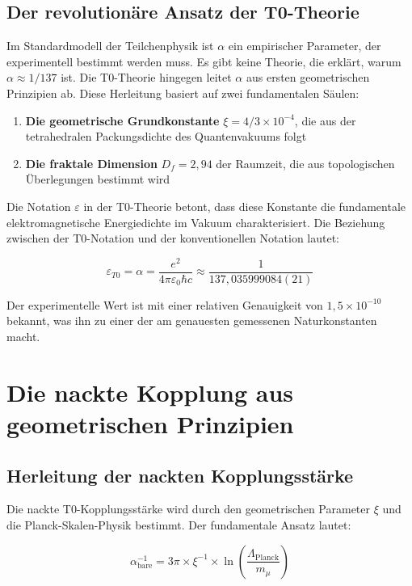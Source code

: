 \documentclass[12pt,a4paper]{article}
\theoremstyle{definition}
\begin{document}
	\subsection{Der revolutionäre Ansatz der T0-Theorie}
	
	Im Standardmodell der Teilchenphysik ist $\alpha$ ein empirischer Parameter, der experimentell bestimmt werden muss. Es gibt keine Theorie, die erklärt, warum $\alpha \approx 1/137$ ist. Die T0-Theorie hingegen leitet $\alpha$ aus ersten geometrischen Prinzipien ab. Diese Herleitung basiert auf zwei fundamentalen Säulen:
	
	\begin{enumerate}
		\item \textbf{Die geometrische Grundkonstante} $\xi = 4/3 \times 10^{-4}$, die aus der tetrahedralen Packungsdichte des Quantenvakuums folgt
		\item \textbf{Die fraktale Dimension} $D_f = 2{,}94$ der Raumzeit, die aus topologischen Überlegungen bestimmt wird
	\end{enumerate}
	
	Die Notation $\varepsilon$ in der T0-Theorie betont, dass diese Konstante die fundamentale elektromagnetische Energiedichte im Vakuum charakterisiert. Die Beziehung zwischen der T0-Notation und der konventionellen Notation lautet:
	
	\begin{equation}
		\varepsilon_{T0} = \alpha = \frac{e^2}{4\pi\varepsilon_0\hbar c} \approx \frac{1}{137{,}035999084(21)}
	\end{equation}
	
	Der experimentelle Wert ist mit einer relativen Genauigkeit von $1{,}5 \times 10^{-10}$ bekannt, was ihn zu einer der am genauesten gemessenen Naturkonstanten macht.
	
	\section{Die nackte Kopplung aus geometrischen Prinzipien}
	
	\subsection{Herleitung der nackten Kopplungsstärke}
	
	Die nackte T0-Kopplungsstärke wird durch den geometrischen Parameter $\xi$ und die Planck-Skalen-Physik bestimmt. Der fundamentale Ansatz lautet:
	
	\begin{equation}
		\alpha_{\text{bare}}^{-1} = 3\pi \times \xi^{-1} \times \ln\left(\frac{\Lambda_{\text{Planck}}}{m_{\mu}}\right)
	\end{equation}
	
\end{document}
